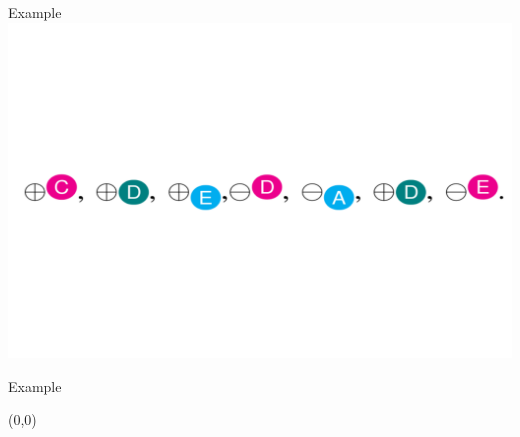 \documentclass[english]{beamer} %
\begin{document}










\begin{frame}{Example}
\includegraphics[scale=0.5]{fig/example}
\end{frame}


\begin{frame}{Example}
\begin{textblock}{1}(0,0)
\end{textblock}
\end{frame}
\end{document}
